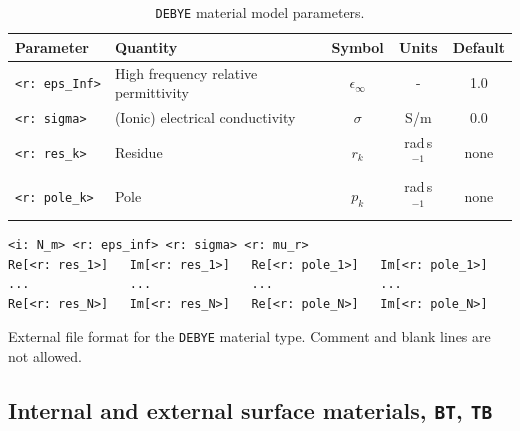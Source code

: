 \documentclass[onecolumn,a4paper]{article}
\numberwithin{equation}{section}
\begin{document}
\begin{table}[ht]
\begin{center}
\begin{tabular}{|l|l|c|c|c|}
\hline
Parameter              &Quantity                             &Symbol              &Units         &Default  \\  
\hline
\texttt{<r:~eps\_Inf>} &High frequency relative permittivity &$\epsilon_\infty$   &-             &1.0       \\
\texttt{<r:~sigma>}    &(Ionic) electrical conductivity      &$\sigma$            &S/m           &0.0       \\
\texttt{<r:~res\_k>}   &Residue                              &$r_k$               &rad\,s$^{-1}$ &none      \\ 
\texttt{<r:~pole\_k>}  &Pole                                 &$p_k$               &rad\,s$^{-1}$ &none      \\
\hline
\end{tabular}
\caption{\label{tb:mbdebye}\texttt{DEBYE} material model parameters.}
\end{center}
\end{table}

\begin{table}[ht]
\begin{center}
\begin{Verbatim}[frame=single]
<i: N_m> <r: eps_inf> <r: sigma> <r: mu_r>
Re[<r: res_1>]   Im[<r: res_1>]   Re[<r: pole_1>]   Im[<r: pole_1>]
...              ...              ...               ...
Re[<r: res_N>]   Im[<r: res_N>]   Re[<r: pole_N>]   Im[<r: pole_N>]
\end{Verbatim}
\vspace{-3mm}
\caption{\label{tb:mbdebext}External file format for the \texttt{DEBYE} material type. Comment and blank lines are not allowed.}
\end{center}
\end{table}

\subsection{Internal and external surface materials, \texttt{BT}, \texttt{TB}}
\end{document}
